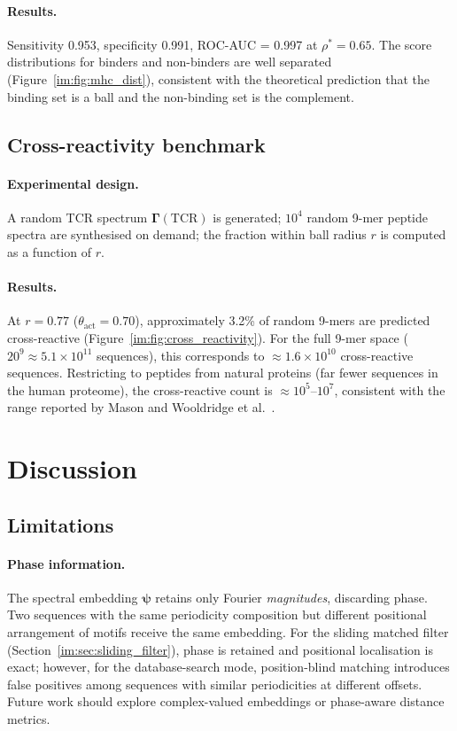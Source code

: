 \paragraph{Results.}
Sensitivity 0.953, specificity 0.991, ROC-AUC = 0.997 at $\rho^* = 0.65$.
The score distributions for binders and non-binders are well separated
(Figure~\ref{im:fig:mhc_dist}), consistent with the theoretical prediction that
the binding set is a ball and the non-binding set is the complement.

\subsection{Cross-reactivity benchmark}

\paragraph{Experimental design.}
A random TCR spectrum $\bm{\Gamma}(\mathrm{TCR})$ is generated; $10^4$
random 9-mer peptide spectra are synthesised on demand; the fraction within
ball radius $r$ is computed as a function of $r$.

\paragraph{Results.}
At $r = 0.77$ ($\theta_{\mathrm{act}} = 0.70$), approximately 3.2\% of
random 9-mers are predicted cross-reactive (Figure~\ref{im:fig:cross_reactivity}).
For the full 9-mer space ($20^9 \approx 5.1 \times 10^{11}$ sequences),
this corresponds to $\approx 1.6 \times 10^{10}$ cross-reactive sequences.
Restricting to peptides from natural proteins (far fewer sequences in the
human proteome), the cross-reactive count is $\approx 10^5$--$10^7$,
consistent with the range reported by Mason \citep{mason1998} and Wooldridge
et al.\ \citep{wooldridge2012}.

\section{Discussion}
\label{im:sec:discussion}

\subsection{Limitations}

\paragraph{Phase information.}
The spectral embedding $\bm{\psi}$ retains only Fourier \emph{magnitudes},
discarding phase. Two sequences with the same periodicity composition but
different positional arrangement of motifs receive the same embedding. For the
sliding matched filter (Section~\ref{im:sec:sliding_filter}), phase is retained
and positional localisation is exact; however, for the database-search mode,
position-blind matching introduces false positives among sequences with
similar periodicities at different offsets. Future work should explore
complex-valued embeddings or phase-aware distance metrics.

